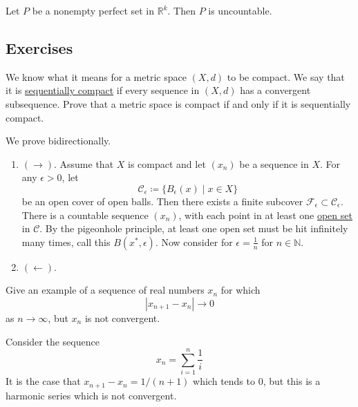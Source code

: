   \begin{theorem}
    \label{thm:nonempty-perfect-sets-are-uncountable}
    Let $P$ be a nonempty perfect set in $\mathbb{R}^k$. Then $P$ is uncountable. 
  \end{theorem}

\subsection{Exercises} 

  \begin{exercise}
    We know what it means for a metric space $(X,d)$ to be compact. We say that it is \hyperref[pst-def:sequentially-compact]{sequentially compact} if every sequence in $(X,d)$ has a convergent subsequence. Prove that a metric space is compact if and only if it is sequentially compact.
  \end{exercise}
  \begin{solution}
    We prove bidirectionally. 
    \begin{enumerate}
      \item $(\rightarrow)$. Assume that $X$ is compact and let $(x_n)$ be a sequence in $X$. For any $\epsilon > 0$, let 
      \begin{equation}
        \mathscr{C}_{\epsilon} \coloneqq \{B_{\epsilon} (x) \mid x \in X\}
      \end{equation}
      be an open cover of open balls. Then there exists a finite subcover $\mathcal{F}_\epsilon \subset \mathscr{C}_\epsilon$. There is a countable sequence $(x_n)$, with each point in at least one \hyperref[pst-def:open-set]{open set} in $\mathscr{C}$. By the pigeonhole principle, at least one open set must be hit infinitely many times, call this $B (x^\ast, \epsilon)$. Now consider for $\epsilon = \frac{1}{n}$ for $n \in \mathbb{N}$. 
      \item $(\leftarrow)$. 
    \end{enumerate}
  \end{solution}

  \begin{exercise}
    Give an example of a sequence of real numbers $x_n$ for which
    \begin{equation}
      |x_{n+1} - x_n| \to 0
    \end{equation}
    as $n \to \infty$, but $x_n$ is not convergent.
  \end{exercise}
  \begin{solution}
    Consider the sequence 
    \begin{equation}
      x_n = \sum_{i=1}^n \frac{1}{i}
    \end{equation} 
    It is the case that $x_{n+1} - x_n = 1/(n+1)$ which tends to $0$, but this is a harmonic series which is not convergent. 
  \end{solution}


